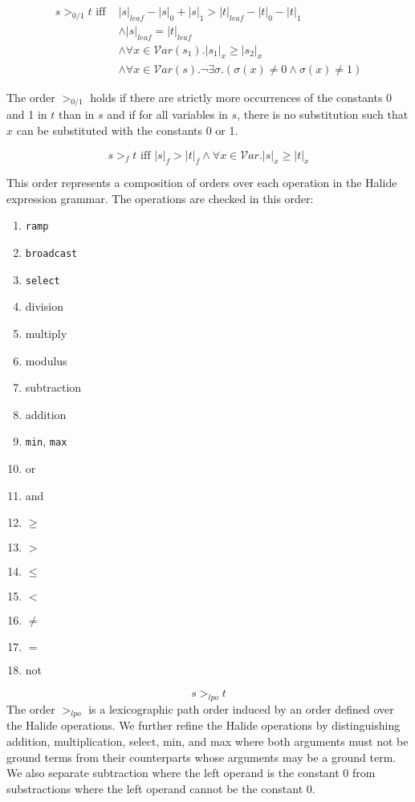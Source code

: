 \begin{equation}
\begin{split}
s >_{0/1} t \textrm{ iff } & |s|_{leaf} - |s|_0 + |s|_1 > |t|_{leaf} - |t|_0 - |t|_1 \\
&  \wedge |s|_{leaf} = |t|_{leaf} \\
& \wedge \forall x \in \mathcal{V}ar(s_1) . |s_1|_x \geq |s_2|_x \\ 
& \wedge \forall x \in \mathcal{V}ar(s) . \lnot \exists \sigma . (\sigma(x) \neq 0 \wedge \sigma(x) \neq 1)
\end{split}
\end{equation}

The order $>_{0/1}$ holds if there are strictly more occurrences of the constants 0 and 1 in $t$ than in $s$ and if for all variables in $s$, there is no substitution such that $x$ can be substituted with the constants 0 or 1.

\begin{equation}
s >_{f} t \textrm{ iff } |s|_{f} > |t|_{f} \wedge \forall x \in \mathcal{V}ar . |s|_x \geq |t|_x
\end{equation} 

This order represents a composition of orders over each operation in the Halide expression grammar. The operations are checked in this order:

\begin{enumerate}
  \item \texttt{ramp}
  \item \texttt{broadcast}
  \item \texttt{select}
  \item division
  \item multiply
  \item modulus
  \item subtraction
  \item addition
  \item \texttt{min}, \texttt{max}
  \item or
  \item and
  \item $\geq$
  \item $>$
  \item $\leq$
  \item $<$
  \item $\neq$
  \item $=$
  \item not
\end{enumerate}

\begin{equation}
s >_{lpo} t
\end{equation}
The order $>_{lpo}$ is a lexicographic path order induced by an order defined over the Halide operations. We further refine the Halide operations by distinguishing addition, multiplication, select, min, and max where both arguments must not be ground terms from their counterparts whose arguments may be a ground term. We also separate subtraction where the left operand is the constant 0 from substractions where the left operand cannot be the constant 0.

